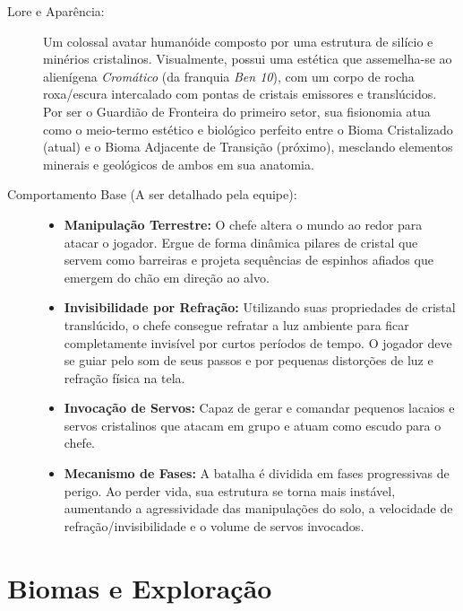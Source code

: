 \documentclass[a4paper,12pt]{report}
\begin{document}
\begin{description}
    \item[Lore e Aparência:]
    Um colossal avatar humanóide composto por uma estrutura de silício e minérios cristalinos. Visualmente, possui uma estética que assemelha-se ao alienígena \textit{Cromático} (da franquia \textit{Ben 10}), com um corpo de rocha roxa/escura intercalado com pontas de cristais emissores e translúcidos. Por ser o Guardião de Fronteira do primeiro setor, sua fisionomia atua como o meio-termo estético e biológico perfeito entre o Bioma Cristalizado (atual) e o Bioma Adjacente de Transição (próximo), mesclando elementos minerais e geológicos de ambos em sua anatomia.

    \item[Comportamento Base (A ser detalhado pela equipe):]
    \begin{itemize}
        \item \textbf{Manipulação Terrestre:} O chefe altera o mundo ao redor para atacar o jogador. Ergue de forma dinâmica pilares de cristal que servem como barreiras e projeta sequências de espinhos afiados que emergem do chão em direção ao alvo.
        \item \textbf{Invisibilidade por Refração:} Utilizando suas propriedades de cristal translúcido, o chefe consegue refratar a luz ambiente para ficar completamente invisível por curtos períodos de tempo. O jogador deve se guiar pelo som de seus passos e por pequenas distorções de luz e refração física na tela.
        \item \textbf{Invocação de Servos:} Capaz de gerar e comandar pequenos lacaios e servos cristalinos que atacam em grupo e atuam como escudo para o chefe.
        \item \textbf{Mecanismo de Fases:} A batalha é dividida em fases progressivas de perigo. Ao perder vida, sua estrutura se torna mais instável, aumentando a agressividade das manipulações do solo, a velocidade de refração/invisibilidade e o volume de servos invocados.
    \end{itemize}
\end{description}

\chapter{Biomas e Exploração}
\end{document}
